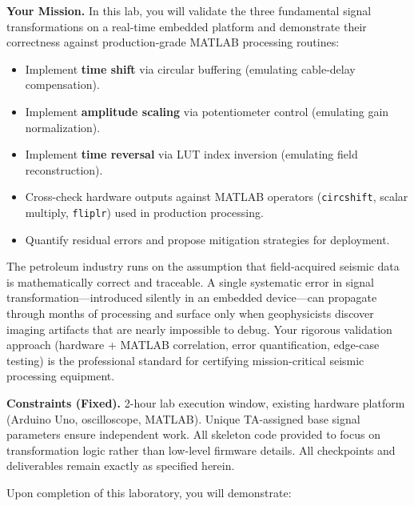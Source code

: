 \documentclass[11pt,letterpaper]{article}
\begin{document}
\noindent
\textbf{Your Mission.} In this lab, you will validate the three fundamental signal transformations on a real-time embedded platform and demonstrate their correctness against production-grade MATLAB processing routines:
\begin{itemize}
    \item Implement \textbf{time shift} via circular buffering (emulating cable-delay compensation).
    \item Implement \textbf{amplitude scaling} via potentiometer control (emulating gain normalization).
    \item Implement \textbf{time reversal} via LUT index inversion (emulating field reconstruction).
    \item Cross-check hardware outputs against MATLAB operators (\texttt{circshift}, scalar multiply, \texttt{fliplr}) used in production processing.
    \item Quantify residual errors and propose mitigation strategies for deployment.
\end{itemize}

\noindent
The petroleum industry runs on the assumption that field-acquired seismic data is mathematically correct and traceable. A single systematic error in signal transformation—introduced silently in an embedded device—can propagate through months of processing and surface only when geophysicists discover imaging artifacts that are nearly impossible to debug. Your rigorous validation approach (hardware + MATLAB correlation, error quantification, edge-case testing) is the professional standard for certifying mission-critical seismic processing equipment.

\noindent
\textbf{Constraints (Fixed).} 2-hour lab execution window, existing hardware platform (Arduino Uno, oscilloscope, MATLAB). Unique TA-assigned base signal parameters ensure independent work. All skeleton code provided to focus on transformation logic rather than low-level firmware details. All checkpoints and deliverables remain exactly as specified herein.

\clearpage

Upon completion of this laboratory, you will demonstrate:
\end{document}
